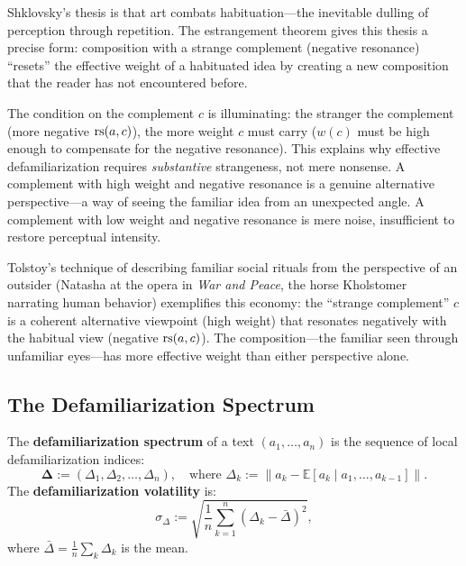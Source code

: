 \begin{interpretation}
\label{interp:estrangement}
Shklovsky's thesis is that art combats habituation---the inevitable
dulling of perception through repetition.  The estrangement theorem gives
this thesis a precise form: composition with a strange complement
(negative resonance) ``resets'' the effective weight of a habituated idea by
creating a new composition that the reader has not encountered before.

The condition on the complement $c$ is illuminating: the stranger the
complement (more negative $\mathrm{rs}(a, c)$), the more weight $c$ must carry
($w(c)$ must be high enough to compensate for the negative resonance).
This explains why effective defamiliarization requires \emph{substantive}
strangeness, not mere nonsense.  A complement with high weight and negative
resonance is a genuine alternative perspective---a way of seeing the familiar
idea from an unexpected angle.  A complement with low weight and negative
resonance is mere noise, insufficient to restore perceptual intensity.

Tolstoy's technique of describing familiar social rituals from the
perspective of an outsider (Natasha at the opera in \textit{War and Peace},
the horse Kholstomer narrating human behavior) exemplifies this economy:
the ``strange complement'' $c$ is a coherent alternative viewpoint (high
weight) that resonates negatively with the habitual view (negative $\mathrm{rs}(a, c)$).
The composition---the familiar seen through unfamiliar eyes---has more
effective weight than either perspective alone.
\end{interpretation}

\subsection{The Defamiliarization Spectrum}

\begin{definition}
\label{def:defam-spectrum}
The \textbf{defamiliarization spectrum} of a text $(a_1, \ldots, a_n)$
is the sequence of local defamiliarization indices:
\[
  \mathbf{\Delta} := (\Delta_1, \Delta_2, \ldots, \Delta_n),
  \quad \text{where } \Delta_k := \|a_k - \mathbb{E}[a_k \mid a_1, \ldots, a_{k-1}]\|.
\]
The \textbf{defamiliarization volatility} is:
\[
  \sigma_\Delta := \sqrt{\frac{1}{n}\sum_{k=1}^{n}(\Delta_k - \bar{\Delta})^2},
\]
where $\bar{\Delta} = \frac{1}{n}\sum_k \Delta_k$ is the mean.
\end{definition}

